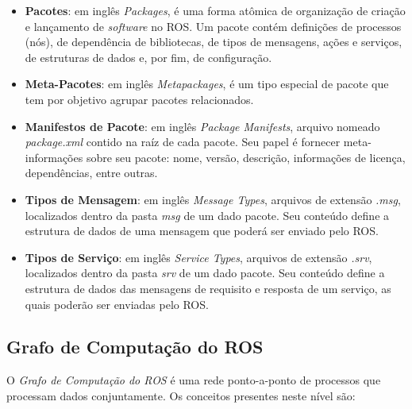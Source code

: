             \begin{itemize}
                \item \textbf{Pacotes}: em inglês \textit{Packages}, é uma forma atômica de organização de criação e lançamento de \textit{software} no ROS. Um pacote contém definições de processos (nós), de dependência de bibliotecas, de tipos de mensagens, ações e serviços, de estruturas de dados e, por fim, de configuração. 
                
                \item \textbf{Meta-Pacotes}: em inglês \textit{Metapackages}, é um tipo especial de pacote que tem por objetivo agrupar pacotes relacionados.
                
                \item \textbf{Manifestos de Pacote}: em inglês \textit{Package Manifests}, arquivo nomeado \textit{package.xml} contido na raíz de cada pacote. Seu papel é fornecer meta-informações sobre seu pacote: nome, versão, descrição, informações de licença, dependências, entre outras. 
                
                \item \textbf{Tipos de Mensagem}: em inglês \textit{Message Types}, arquivos de extensão \textit{.msg}, localizados dentro da pasta \textit{msg} de um dado pacote. Seu conteúdo define a estrutura de dados de uma mensagem que poderá ser enviado pelo ROS.
                
                \item \textbf{Tipos de Serviço}: em inglês \textit{Service Types}, arquivos de extensão \textit{.srv}, localizados dentro da pasta \textit{srv} de um dado pacote. Seu conteúdo define a estrutura de dados das mensagens de requisito e resposta de um serviço, as quais poderão ser enviadas pelo ROS.
            \end{itemize}
            
        \subsection{Grafo de Computação do ROS}
        
            O \textit{Grafo de Computação do ROS} é uma rede ponto-a-ponto de processos que processam dados conjuntamente. Os conceitos presentes neste nível são:
            
